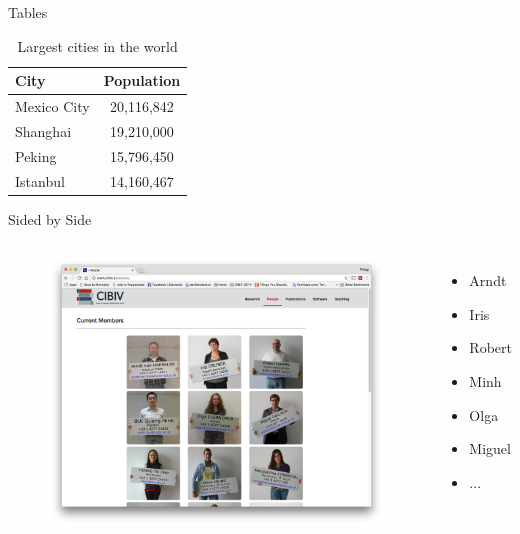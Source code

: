 \documentclass[10pt]{beamer}
\begin{document}
\begin{frame}{Tables}

	\begin{table}
		\caption{Largest cities in the world}
		
		\begin{tabular}{lc}
			\toprule 
			\textbf{City} & \textbf{Population}\\
			\midrule
			Mexico City & 20,116,842\\
			Shanghai & 19,210,000\\
			Peking & 15,796,450\\
			Istanbul & 14,160,467\\
			\bottomrule
		\end{tabular}

	\end{table}	
	
\end{frame}

\begin{frame}{Sided by Side}

	\begin{columns}
			\begin{figure}[c]
				\vspace{-1.5em}
				\includegraphics[width=1\textwidth]{img/cibiv_people}
			\end{figure}
			\begin{itemize}
				\item Arndt
				\item Iris
				\item Robert
				\item Minh
				\item Olga
				\item Miguel
				\item ...
			\end{itemize}
	\end{columns}
	
\end{frame}
\end{document}
